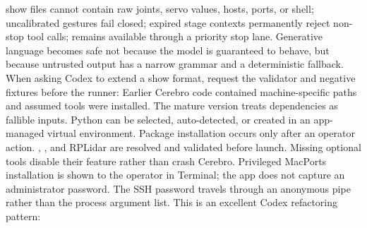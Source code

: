 \markdownRendererUlItem show files cannot contain raw joints, servo values, hosts, ports, or shell;\markdownRendererUlItemEnd 
\markdownRendererUlItem uncalibrated gestures fail closed;\markdownRendererUlItemEnd 
\markdownRendererUlItem expired stage contexts permanently reject non-stop tool calls;\markdownRendererUlItemEnd 
\markdownRendererUlItem {} remains available through a priority stop lane.\markdownRendererUlItemEnd 
\markdownRendererUlEnd \markdownRendererInterblockSeparator
{}Generative language becomes safe not because the model is guaranteed to behave,\markdownRendererSoftLineBreak
{}but because untrusted output has a narrow grammar and a deterministic fallback.\markdownRendererParagraphSeparator
{}When asking Codex to extend a show format, request the validator and negative\markdownRendererSoftLineBreak
{}fixtures before the runner:\markdownRendererInterblockSeparator
{}\markdownRendererInterblockSeparator
{}\markdownRendererThematicBreak{}\markdownRendererInterblockSeparator
{}
\markdownRendererSectionEnd \markdownRendererSectionBegin
{}\markdownRendererInterblockSeparator
{}Earlier Cerebro code contained machine-specific paths and assumed tools were\markdownRendererSoftLineBreak
{}installed. The mature version treats dependencies as fallible inputs.\markdownRendererParagraphSeparator
{}Python can be selected, auto-detected, or created in an app-managed virtual\markdownRendererSoftLineBreak
{}environment. Package installation occurs only after an operator action.\markdownRendererSoftLineBreak
{}, , and RPLidar are resolved and validated before launch.\markdownRendererSoftLineBreak
{}Missing optional tools disable their feature rather than crash Cerebro.\markdownRendererSoftLineBreak
{}Privileged MacPorts installation is shown to the operator in Terminal; the app\markdownRendererSoftLineBreak
{}does not capture an administrator password. The SSH password travels through an\markdownRendererSoftLineBreak
{}anonymous pipe rather than the process argument list.\markdownRendererParagraphSeparator
{}This is an excellent Codex refactoring pattern:\markdownRendererInterblockSeparator
{}\markdownRendererInterblockSeparator

